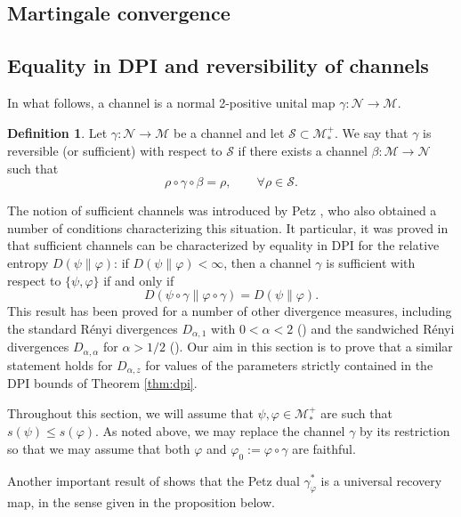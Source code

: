 \documentclass[12pt]{article}
\theoremstyle{definition}
\newtheorem{defi}[theorem]{Definition}
\theoremstyle{remark}
\numberwithin{equation}{section}
\def\Me{\mathcal M}
\def\Ne{\mathcal N}
\begin{document}
\subsection{Martingale convergence}




\subsection{Equality in DPI and reversibility of channels}

In what follows, a channel is a normal 2-positive unital map $\gamma: \Ne\to \Me$.

\begin{defi} Let $\gamma:\Ne\to \Me$ be a channel and let $\mathcal S \subset
\Me_*^+$. We say that $\gamma$ is reversible (or sufficient) with respect to $\mathcal S$
if there exists a channel $\beta:\Me\to \Ne$ such that
\[
\rho\circ\gamma\circ\beta=\rho,\qquad \forall \rho\in \mathcal S.
\]

\end{defi}

The notion of sufficient channels was introduced by Petz
\cite{petz1986sufficient,petz1988sufficiency}, who also obtained a number of conditions
characterizing this situation. It particular, it was proved in \cite{petz1988sufficiency}
that sufficient channels can be characterized by equality in DPI for the relative entropy
$D(\psi\|\varphi)$: if $D(\psi\|\varphi)<\infty$, then a channel $\gamma$ is sufficient
with respect to $\{\psi,\varphi\}$ if and only if 
\[
D(\psi\circ\gamma\|\varphi\circ\gamma)=D(\psi\|\varphi). 
\]
This result has been proved for a number of other divergence measures, including the
standard R\'enyi divergences $D_{\alpha,1}$ with $0<\alpha<2$ (\cite{}) and the sandwiched
R\'enyi divergences $D_{\alpha,\alpha}$ for $\alpha>1/2$
(\cite{jencova2018renyi,jencova2021renyi}).
Our aim in this section is to prove that a similar statement holds for $D_{\alpha,z}$ for
values of the parameters strictly contained in the DPI bounds of Theorem \ref{thm:dpi}. 

Throughout this section, we will assume that  $\psi,\varphi\in\Me_*^+$ are such that
$s(\psi)\le s(\varphi)$. As noted above, we may replace the channel $\gamma$ by its
restriction so that we may assume that both $\varphi$ and $\varphi_0:=\varphi\circ\gamma$
are faithful. 

Another important result of \cite{petz1988sufficiency} shows that the Petz dual $\gamma_\varphi^*$ is a universal
recovery map, in the sense given in the proposition below. 
\end{document}
